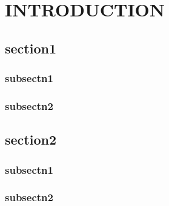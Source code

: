 \documentclass[12pt,a4paper]{report}
\begin{document}
    
    \chapter{INTRODUCTION}
    \section{section1}
    \subsection{subsectn1}
    \subsection{subsectn2}
    \section{section2}
    \subsection{subsectn1}
    \subsection{subsectn2}

    
    
    
    
    
    

    \startMainMatter

    
    
    
    
    

    
    
    
    
\end{document}
